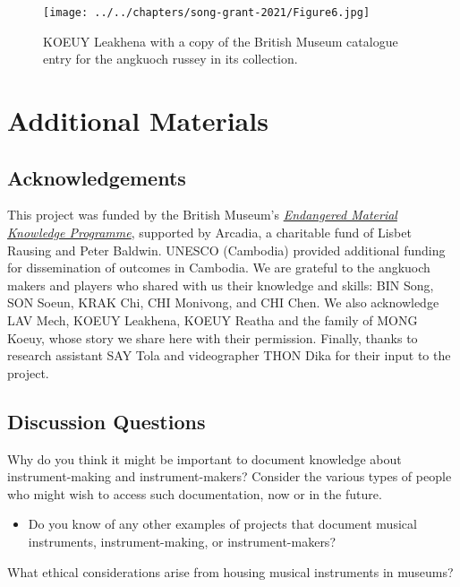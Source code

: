 \documentclass[twoside]{article}
\begin{document}
\begin{figure}
  \texttt{[image: ../../chapters/song-grant-2021/Figure6.jpg]}
  \caption{KOEUY Leakhena with a copy
  of the British Museum catalogue entry for the angkuoch russey in its
  collection.}
\end{figure}

\hypertarget{additional-materials}{%
\section*{Additional Materials}\label{additional-materials}}

\hypertarget{acknowledgements}{%
\subsection*{Acknowledgements}\label{acknowledgements}}

This project was funded by the British Museum's
\href{https://www.emkp.org/documentingcambodianmouthharp/}{\emph{Endangered
Material Knowledge Programme}}, supported by Arcadia, a charitable fund
of Lisbet Rausing and Peter Baldwin. UNESCO (Cambodia) provided
additional funding for dissemination of outcomes in Cambodia. We are
grateful to the angkuoch makers and players who shared with us their
knowledge and skills: BIN Song, SON Soeun, KRAK Chi, CHI Monivong, and
CHI Chen. We also acknowledge LAV Mech, KOEUY Leakhena, KOEUY Reatha and
the family of MONG Koeuy, whose story we share here with their
permission. Finally, thanks to research assistant SAY Tola and
videographer THON Dika for their input to the project.

\hypertarget{discussion-questions}{%
\subsection*{Discussion Questions}\label{discussion-questions}}

Why do you think it might be important to document knowledge about
instrument-making and instrument-makers? Consider the various types of
people who might wish to access such documentation, now or in the
future.

\begin{itemize}
\item
  Do you know of any other examples of projects that document musical
  instruments, instrument-making, or instrument-makers?
\end{itemize}

What ethical considerations arise from housing musical instruments in
museums?
\end{document}

